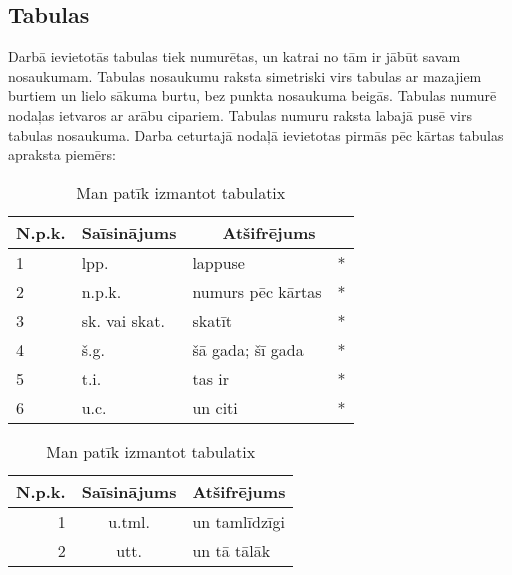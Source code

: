 \subsection{Tabulas}
\hspace*{5mm} Darbā ievietotās tabulas tiek numurētas, un katrai no tām ir jābūt savam
nosaukumam. Tabulas nosaukumu raksta simetriski virs tabulas ar mazajiem burtiem
un lielo sākuma burtu, bez punkta nosaukuma beigās. Tabulas numurē nodaļas
ietvaros ar arābu cipariem. Tabulas numuru raksta labajā pusē virs tabulas
nosaukuma. Darba ceturtajā nodaļā ievietotas pirmās pēc kārtas tabulas apraksta
piemērs:\\
%
	\begin{table}[!th]
	\begin{center}
		 \begin{tabularx}{\textwidth}{|m{1.5cm}|m{4.8cm}|X|X|}
		  \hline 
		  \textbf{N.p.k.} & \textbf{Saīsinājums} &  \multicolumn{2}{c|}{\textbf{Atšifrējums}} \\ 
		  \hline 
		  \hline 
		 1 & lpp. &  lappuse  & * \\ 
		  \hline 
		  2   & n.p.k. &  numurs pēc kārtas  & * \\ 
		  \hline 
		  3 & sk. vai skat. &  skatīt  & * \\ 
		  \hline 
		  4 & š.g. &  šā gada; šī gada  & * \\ 
		  \hline 
		  5 & t.i. &  tas ir & *  \\ 
		  \hline 
		  6 & u.c. &  un citi & *  \\ 
		  \hline 
		  \end{tabularx}  
		\caption{Man patīk izmantot tabulatix}\label{tab:piemers1}
	\end{center}
	\end{table}
%
	\begin{table}[!th]
	\begin{center}
		 \begin{tabularx}{\textwidth}{|r|c|X|}
		  \hline 
		  \textbf{N.p.k.} & \textbf{Saīsinājums} & 	  \textbf{Atšifrējums} \\ 
		  \hline 
		  \hline 
		 1 & u.tml. &  un tamlīdzīgi   \\ 
		  \hline 
		  2   & utt. &  un tā tālāk  \\ 
		  \hline 
		  \end{tabularx}  
		\caption{Man patīk izmantot tabulatix}\label{tab:piemers2}
	\end{center}
	\end{table}

